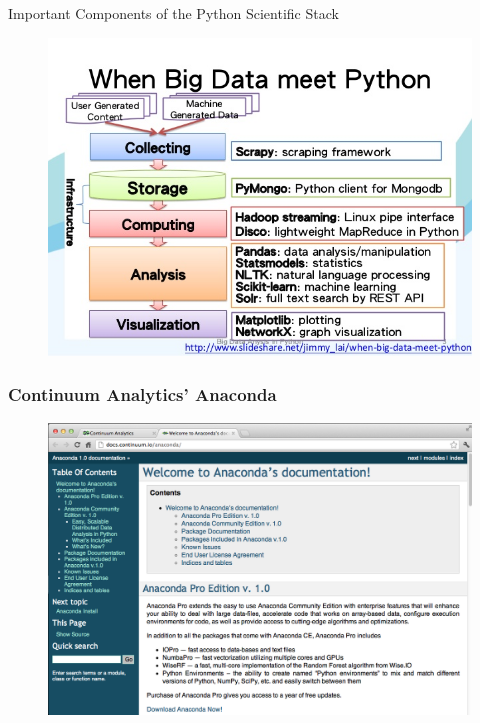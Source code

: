\documentclass[MASTER.tex]{subfiles}
\begin{document}
 
\begin{frame}
\huge
Important Components of the Python Scientific Stack
\end{frame}
\begin{frame}
	\begin{figure}
\centering
\includegraphics[width=0.99\linewidth]{flowchart}

\end{figure}

\end{frame}
\begin{frame}
	\frametitle{Continuum Analytics’ Anaconda}
	\begin{figure}
\centering
\includegraphics[width=1.0\linewidth]{anaconda.png}

\end{figure}

\end{frame}
\end{document}
